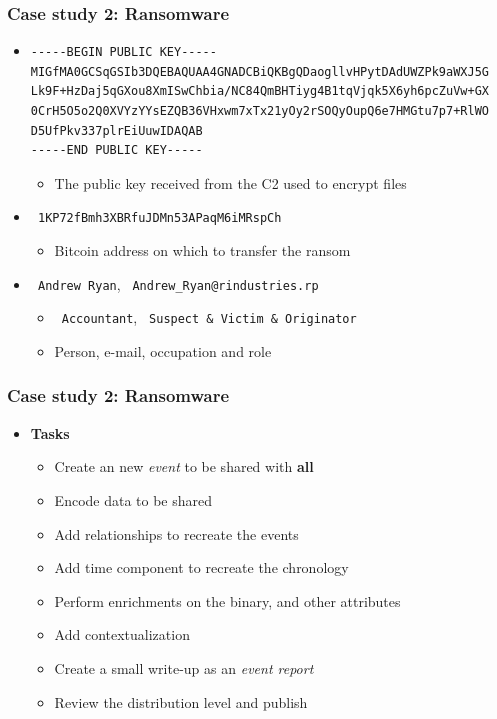 \begin{frame}[fragile]
    \frametitle{Case study 2: Ransomware}
    \begin{itemize}
        \item \begin{lstlisting}
-----BEGIN PUBLIC KEY-----
MIGfMA0GCSqGSIb3DQEBAQUAA4GNADCBiQKBgQDaogllvHPytDAdUWZPk9aWXJ5G
Lk9F+HzDaj5qGXou8XmISwChbia/NC84QmBHTiyg4B1tqVjqk5X6yh6pcZuVw+GX
0CrH5O5o2Q0XVYzYYsEZQB36VHxwm7xTx21yOy2rSOQyOupQ6e7HMGtu7p7+RlWO
D5UfPkv337plrEiUuwIDAQAB
-----END PUBLIC KEY-----
\end{lstlisting}
        \begin{itemize}
            \item The public key received from the C2 used to encrypt files
        \end{itemize}
        \item \texttt{\color{black} 1KP72fBmh3XBRfuJDMn53APaqM6iMRspCh}
        \begin{itemize}
            \item Bitcoin address on which to transfer the ransom
        \end{itemize}
        \item \texttt{\color{black} Andrew Ryan}, \texttt{\color{black} Andrew\_Ryan@rindustries.rp}
        \begin{itemize}
            \item \texttt{\color{black} Accountant}, \texttt{\color{black} Suspect \& Victim \& Originator}
            \item Person, e-mail, occupation and role
        \end{itemize}
    \end{itemize}

\end{frame}

\begin{frame}
    \frametitle{Case study 2: Ransomware}
    \begin{itemize}
        \item[] \textbf{Tasks}
        \begin{itemize}
            \item Create an new \textit{event} to be shared with \textbf{all}
            \item Encode data to be shared
            \item Add relationships to recreate the events
            \item Add time component to recreate the chronology
            \item Perform enrichments on the binary, and other attributes
            \item Add contextualization
            \item Create a small write-up as an \textit{event report}
            \item Review the distribution level and publish
        \end{itemize}
    \end{itemize}
\end{frame}

